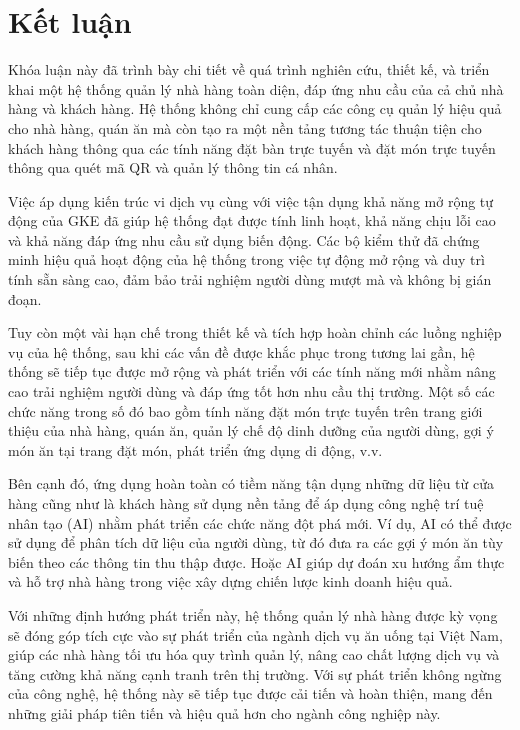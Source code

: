 \chapter*{Kết luận}\label{chap5}
Khóa luận này đã trình bày chi tiết về quá trình nghiên cứu, thiết kế, và triển khai một hệ thống quản lý nhà hàng toàn diện, đáp ứng nhu cầu của cả chủ nhà hàng và khách hàng.
Hệ thống không chỉ cung cấp các công cụ quản lý hiệu quả cho nhà hàng, quán ăn mà còn tạo ra một nền tảng tương tác thuận tiện cho khách hàng thông qua các tính năng đặt bàn trực tuyến và đặt món trực tuyến thông qua quét mã QR và quản lý thông tin cá nhân.

Việc áp dụng kiến trúc vi dịch vụ cùng với việc tận dụng khả năng mở rộng tự động của GKE đã giúp hệ thống đạt được tính linh hoạt, khả năng chịu lỗi cao và khả năng đáp ứng nhu cầu sử dụng biến động. Các bộ kiểm thử đã chứng minh hiệu quả hoạt động của hệ thống trong việc tự động mở rộng và duy trì tính sẵn sàng cao, đảm bảo trải nghiệm người dùng mượt mà và không bị gián đoạn.

Tuy còn một vài hạn chế trong thiết kế và tích hợp hoàn chỉnh các luồng nghiệp vụ của hệ thống, sau khi các vấn đề được khắc phục trong tương lai gần, hệ thống sẽ tiếp tục được mở rộng và phát triển với các tính năng mới nhằm nâng cao trải nghiệm người dùng và đáp ứng tốt hơn nhu cầu thị trường.
Một số các chức năng trong số đó bao gồm tính năng đặt món trực tuyến trên trang giới thiệu của nhà hàng, quán ăn, quản lý chế độ dinh dưỡng của người dùng, gợi ý món ăn tại trang đặt món, phát triển ứng dụng di động, v.v.

Bên cạnh đó, ứng dụng hoàn toàn có tiềm năng tận dụng những dữ liệu từ cửa hàng cũng như là khách hàng sử dụng nền tảng để áp dụng công nghệ trí tuệ nhân tạo (AI) nhằm phát triển các chức năng đột phá mới.
Ví dụ, AI có thể được sử dụng để phân tích dữ liệu của người dùng, từ đó đưa ra các gợi ý món ăn tùy biến theo các thông tin thu thập được.
Hoặc AI giúp dự đoán xu hướng ẩm thực và hỗ trợ nhà hàng trong việc xây dựng chiến lược kinh doanh hiệu quả.

Với những định hướng phát triển này, hệ thống quản lý nhà hàng được kỳ vọng sẽ đóng góp tích cực vào sự phát triển của ngành dịch vụ ăn uống tại Việt Nam, giúp các nhà hàng tối ưu hóa quy trình quản lý, nâng cao chất lượng dịch vụ và tăng cường khả năng cạnh tranh trên thị trường.
Với sự phát triển không ngừng của công nghệ, hệ thống này sẽ tiếp tục được cải tiến và hoàn thiện, mang đến những giải pháp tiên tiến và hiệu quả hơn cho ngành công nghiệp này.